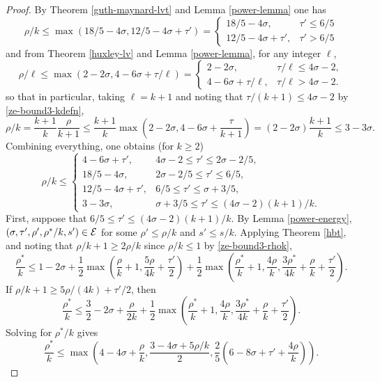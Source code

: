 \begin{proof}
By Theorem \ref{guth-maynard-lvt} and Lemma \ref{power-lemma} one has
\[
\rho/k \le \max(18/5 - 4\sigma, 12/5 - 4\sigma + \tau') = \begin{cases}
18/5 - 4\sigma,& \tau' \le 6/5\\
12/5 - 4\sigma + \tau',&\tau' > 6/5
\end{cases}
\]
and from Theorem \ref{huxley-lv} and Lemma \ref{power-lemma}, for any integer $\ell$,
\[
\rho/\ell \le \max(2 -2\sigma, 4 - 6\sigma + \tau/\ell) = \begin{cases}
2 - 2\sigma,&\tau/\ell \le 4\sigma - 2,\\
4 - 6\sigma + \tau/\ell,& \tau/\ell > 4\sigma - 2.
\end{cases}
\]
so that in particular, taking $\ell = k + 1$ and noting that $\tau/(k + 1) \le 4\sigma - 2$ by \eqref{ze-bound3-kdefn},
\[
\rho/k = \frac{k + 1}{k}\frac{\rho}{k + 1} \le \frac{k + 1}{k}\max(2 - 2\sigma, 4 - 6\sigma + \frac{\tau}{k + 1}) = (2 - 2\sigma)\frac{k + 1}{k} \le 3 - 3\sigma.
\]
Combining everything, one obtains (for $k \ge 2$)
\begin{equation}
\label{ze-bound3-rhok}
\rho/k \le \begin{cases}
4 - 6\sigma + \tau',& 4\sigma - 2 \le \tau' \le 2\sigma - 2/5,\\
18/5 - 4\sigma,& 2\sigma - 2/5 \le \tau' \le 6/5,\\
12/5 - 4\sigma + \tau', &6/5 \le \tau' \le \sigma + 3/5,\\
3 - 3\sigma,& \sigma + 3/5 \le \tau' \le (4\sigma - 2)(k + 1)/k.
\end{cases}
\end{equation}
First, suppose that $6/5 \le \tau' \le (4\sigma - 2)(k + 1)/k$. By Lemma \ref{power-energy}, $(\sigma, \tau', \rho', \rho^*/k, s') \in \mathcal{E}$ for some $\rho' \le \rho/k$ and $s' \le s/k$. Applying Theorem \ref{hbt}, and noting that $\rho/k + 1 \ge 2\rho/k$ since $\rho/k \le 1$ by \eqref{ze-bound3-rhok},
\[
\frac{\rho^*}{k} \le 1-2\sigma + \frac{1}{2}\max\left(\frac{\rho}{k}+1, \frac{5\rho}{4k} + \frac{\tau'}{2}\right) + \frac{1}{2}\max\left(\frac{\rho^*}{k}+1, \frac{4\rho}{k}, \frac{3\rho^*}{4k} +\frac{\rho}{k}+\frac{\tau'}{2}\right).
\]
If $\rho/k + 1 \ge 5\rho/(4k) + \tau'/2$, then
\[
\frac{\rho^*}{k} \le \frac{3}{2} - 2\sigma + \frac{\rho}{2k} + \frac{1}{2}\max\left(\frac{\rho^*}{k}+1, \frac{4\rho}{k}, \frac{3\rho^*}{4k} +\frac{\rho}{k}+\frac{\tau'}{2}\right).
\]
Solving for $\rho^*/k$ gives
\[
\frac{\rho^*}{k} \le \max\left(4 - 4\sigma + \frac{\rho}{k}, \frac{3 - 4\sigma + 5\rho/k}{2}, \frac{2}{5}(6 - 8\sigma + \tau' + \frac{4\rho}{k})\right).
\]
\end{proof}
